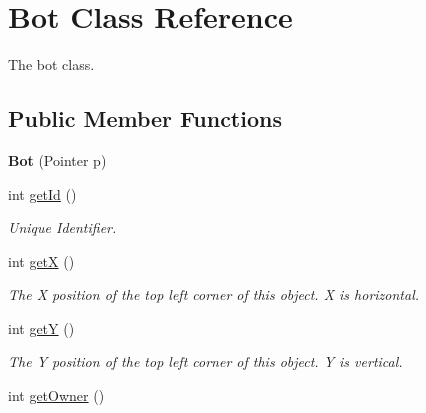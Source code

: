 \hypertarget{classBot}{
\section{Bot Class Reference}
\label{classBot}
}


The bot class.  


\subsection*{Public Member Functions}
\begin{DoxyCompactItemize}
\item 
\hypertarget{classBot_ad76750108be60ff079cad6ec1e6e9c4c}{
{\bfseries Bot} (Pointer p)}
\label{classBot_ad76750108be60ff079cad6ec1e6e9c4c}

\item 
\hypertarget{classBot_a908c7223a746a6a73860eebbca51d857}{
int \hyperlink{classBot_a908c7223a746a6a73860eebbca51d857}{getId} ()}
\label{classBot_a908c7223a746a6a73860eebbca51d857}

\begin{DoxyCompactList}\small\item\em Unique Identifier. \item\end{DoxyCompactList}\item 
\hypertarget{classBot_a8ab5c2dbee60a4e944c19f5937a4f0bc}{
int \hyperlink{classBot_a8ab5c2dbee60a4e944c19f5937a4f0bc}{getX} ()}
\label{classBot_a8ab5c2dbee60a4e944c19f5937a4f0bc}

\begin{DoxyCompactList}\small\item\em The X position of the top left corner of this object. X is horizontal. \item\end{DoxyCompactList}\item 
\hypertarget{classBot_a7b2cd8ef8e2983ad804938dd5922892f}{
int \hyperlink{classBot_a7b2cd8ef8e2983ad804938dd5922892f}{getY} ()}
\label{classBot_a7b2cd8ef8e2983ad804938dd5922892f}

\begin{DoxyCompactList}\small\item\em The Y position of the top left corner of this object. Y is vertical. \item\end{DoxyCompactList}\item 
\hypertarget{classBot_a1c00ffd59e5a6c5ffdbb612170fb9c3c}{
int \hyperlink{classBot_a1c00ffd59e5a6c5ffdbb612170fb9c3c}{getOwner} ()}
\label{classBot_a1c00ffd59e5a6c5ffdbb612170fb9c3c}


\end{DoxyCompactItemize}
